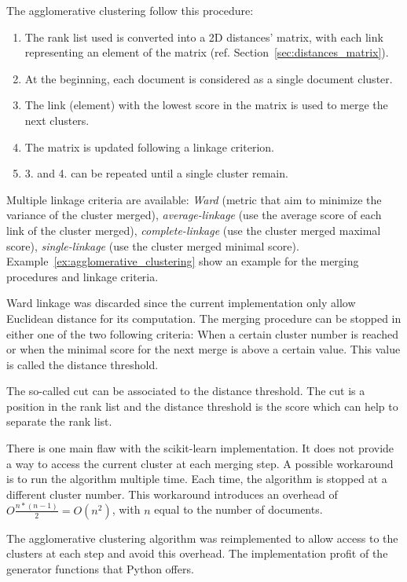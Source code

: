 The agglomerative clustering follow this procedure:
\begin{enumerate}
  \item The rank list used is converted into a 2D distances' matrix, with each link representing an element of the matrix (ref. Section~\ref{sec:distances_matrix}).
  \item At the beginning, each document is considered as a single document cluster.
  \item The link (element) with the lowest score in the matrix is used to merge the next clusters.
  \item The matrix is updated following a linkage criterion.
  \item 3. and 4. can be repeated until a single cluster remain.
\end{enumerate}

Multiple linkage criteria are available: \textit{Ward} (metric that aim to minimize the variance of the cluster merged), \textit{average-linkage} (use the average score of each link of the cluster merged), \textit{complete-linkage} (use the cluster merged maximal score), \textit{single-linkage} (use the cluster merged minimal score).
Example~\ref{ex:agglomerative_clustering} show an example for the merging procedures and linkage criteria.

Ward linkage was discarded since the current implementation only allow Euclidean distance for its computation.
The merging procedure can be stopped in either one of the two following criteria: When a certain cluster number is reached or when the minimal score for the next merge is above a certain value.
This value is called the distance threshold.

The so-called cut can be associated to the distance threshold.
The cut is a position in the rank list and the distance threshold is the score which can help to separate the rank list.

There is one main flaw with the scikit-learn implementation.
It does not provide a way to access the current cluster at each merging step.
A possible workaround is to run the algorithm multiple time.
Each time, the algorithm is stopped at a different cluster number.
This workaround introduces an overhead of $O\frac{n * (n - 1)}{2} = O(n^2)$, with $n$ equal to the number of documents.

The agglomerative clustering algorithm was reimplemented to allow access to the clusters at each step and avoid this overhead.
The implementation profit of the generator functions that Python offers.

